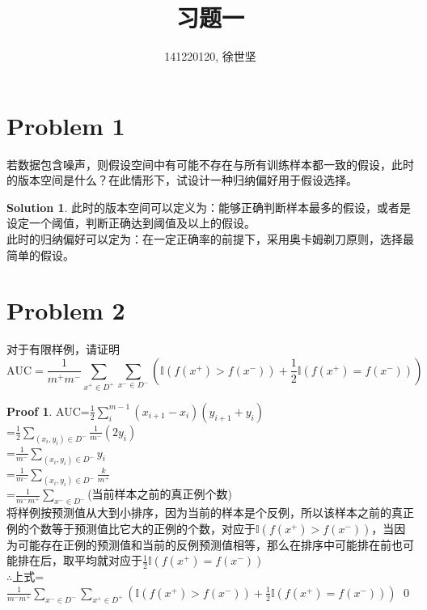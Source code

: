 \documentclass[a4paper,UTF8]{article}
\theoremstyle{definition}
\newtheorem*{solution}{Solution}
\newtheorem*{prove}{Proof}
\begin{document}
\title{习题一}
\author{141220120, 徐世坚}
\maketitle


\section*{Problem 1}
若数据包含噪声，则假设空间中有可能不存在与所有训练样本都一致的假设，此时的版本空间是什么？在此情形下，试设计一种归纳偏好用于假设选择。
\begin{solution}
此时的版本空间可以定义为：能够正确判断样本最多的假设，或者是设定一个阈值，判断正确达到阈值及以上的假设。\\此时的归纳偏好可以定为：在一定正确率的前提下，采用奥卡姆剃刀原则，选择最简单的假设。
\end{solution}

\section*{Problem 2}
对于有限样例，请证明
\[
\text{AUC} = \frac{1}{m^+m^-}\sum_{x^+\in D^+}\sum_{x^-\in D^-}\left(\mathbb{I}(f(x^+)>f(x^-))+\frac{1}{2}\mathbb{I}(f(x^+)=f(x^-))\right)
\]

\begin{prove}
AUC=$\frac{1}{2}\sum_{i}^{m-1}(x_{i+1}-x_{i})(y_{i+1}+y_{i})$\\
=$\frac{1}{2}\sum_{(x_{i},y_{i})\in D^-}\frac{1}{m^-}(2y_{i})$\\
=$\frac{1}{m^-}\sum_{(x_{i},y_{i})\in D^-}y_{i}$\\
=$\frac{1}{m^-}\sum_{(x_{i},y_{i})\in D^-}\frac{k}{m^+}$\\
=$\frac{1}{m^-m^+}\sum_{x^-\in D^-}$(当前样本之前的真正例个数)\\
将样例按预测值从大到小排序，因为当前的样本是个反例，所以该样本之前的真正例的个数等于预测值比它大的正例的个数，对应于$\mathbb{I}(f(x^+)>f(x^-))$，当因为可能存在正例的预测值和当前的反例预测值相等，那么在排序中可能排在前也可能排在后，取平均就对应于$\frac{1}{2}\mathbb{I}(f(x^+)=f(x^-))$\\
$\therefore$上式=$\frac{1}{m^-m^+}\sum_{x^-\in D^-}\sum_{x^+\in D^+}(\mathbb{I}(f(x^+)>f(x^-))+\frac{1}{2}\mathbb{I}(f(x^+)=f(x^-)))$
\qed
\end{prove}
\end{document}
